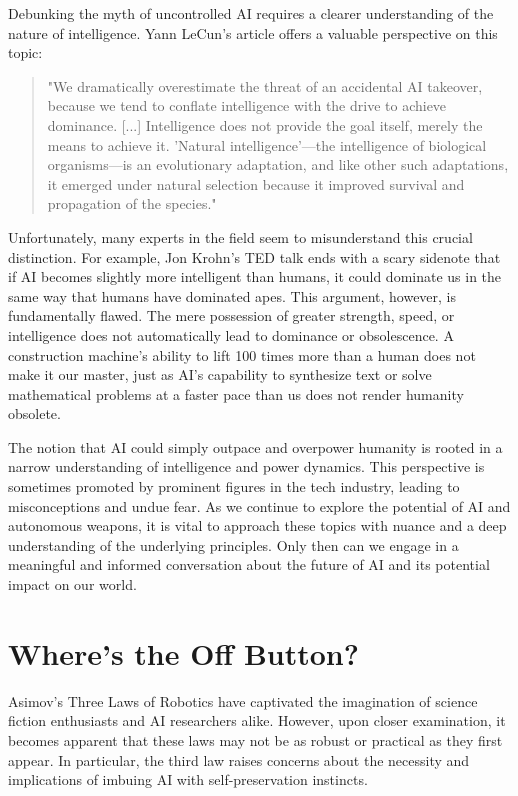 Debunking the myth of uncontrolled AI requires a clearer understanding of the nature of intelligence. Yann LeCun's article  offers a valuable perspective on this topic:

\begin{quote}
"We dramatically overestimate the threat of an accidental AI takeover, because we tend to conflate intelligence with the drive to achieve dominance. [...] Intelligence does not provide the goal itself, merely the means to achieve it. 'Natural intelligence'—the intelligence of biological organisms—is an evolutionary adaptation, and like other such adaptations, it emerged under natural selection because it improved survival and propagation of the species."
\end{quote}

Unfortunately, many experts in the field seem to misunderstand this crucial distinction. For example, Jon Krohn's TED talk ends with a scary sidenote that if AI becomes slightly more intelligent than humans, it could dominate us in the same way that humans have dominated apes. This argument, however, is fundamentally flawed. The mere possession of greater strength, speed, or intelligence does not automatically lead to dominance or obsolescence. A construction machine's ability to lift 100 times more than a human does not make it our master, just as AI's capability to synthesize text or solve mathematical problems at a faster pace than us does not render humanity obsolete.

The notion that AI could simply outpace and overpower humanity is rooted in a narrow understanding of intelligence and power dynamics. This perspective is sometimes promoted by prominent figures in the tech industry, leading to misconceptions and undue fear. As we continue to explore the potential of AI and autonomous weapons, it is vital to approach these topics with nuance and a deep understanding of the underlying principles. Only then can we engage in a meaningful and informed conversation about the future of AI and its potential impact on our world.


\section{Where's the Off Button?}

Asimov's Three Laws of Robotics have captivated the imagination of science fiction enthusiasts and AI researchers alike. However, upon closer examination, it becomes apparent that these laws may not be as robust or practical as they first appear. In particular, the third law raises concerns about the necessity and implications of imbuing AI with self-preservation instincts.

